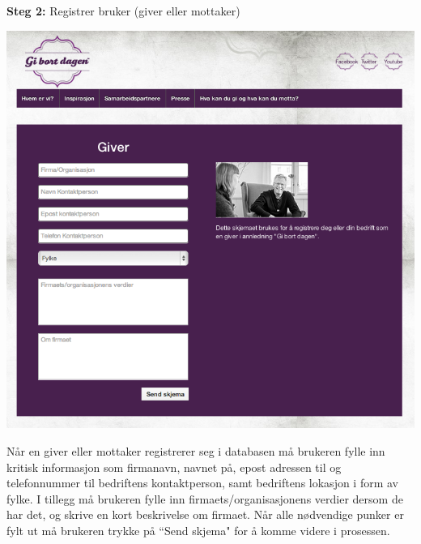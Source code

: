 {\bf Steg 2:} Registrer bruker (giver eller mottaker)
\begin{center}
\includegraphics[clip=true, width=1 \textwidth,
trim=0cm 0cm 0cm 0cm]{registreringavbruker.jpg}
\label{fig:registrering}
\end{center}

Når en giver eller mottaker registrerer seg i databasen må brukeren fylle inn kritisk informasjon som firmanavn, navnet på, epost adressen til og telefonnummer til bedriftens kontaktperson, samt bedriftens lokasjon i form av fylke. I tillegg må brukeren fylle inn firmaets/organisasjonens verdier dersom de har det, og skrive en kort beskrivelse om firmaet. Når alle nødvendige punker er fylt ut må brukeren trykke på ``Send skjema" for å komme videre i prosessen.\\

